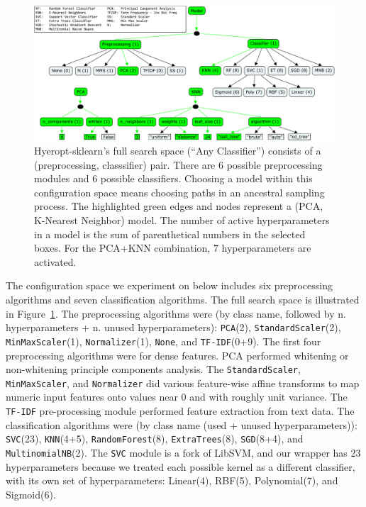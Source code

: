 \documentclass[wcp]{jmlr}
\begin{document}
\begin{figure}
    \centering
    \includegraphics[width=\textwidth]{graphics/sklearn_space_all_together}
    \caption{
        Hyeropt-sklearn's full search space (``Any Classifier'') consists of a (preprocessing, classsifier) pair.
        There are 6 possible preprocessing modules and 6 possible classifiers.
        Choosing a model within this configuration space means choosing paths in an ancestral sampling process.
        The highlighted green edges and nodes represent a (PCA, K-Nearest Neighbor) model.
        The number of active hyperparameters in a model is the sum of parenthetical numbers in the selected boxes. For the PCA+KNN combination, 7 hyperparameters are activated.
    }
    \label{fig:space}
\end{figure}
The configuration space we experiment on below includes six preprocessing algorithms and seven classification algorithms.
The full search space is illustrated in Figure~\ref{fig:space}.
The preprocessing algorithms were (by class name, followed by n. hyperparameters + n. unused hyperparameters): \texttt{PCA}(2), \texttt{StandardScaler}(2), \texttt{MinMaxScaler}(1), \texttt{Normalizer}(1), \texttt{None}, and \texttt{TF-IDF}(0+9).
The first four preprocessing algorithms were for dense features.
PCA performed whitening or non-whitening principle components analysis.
The \texttt{StandardScaler}, \texttt{MinMaxScaler}, and \texttt{Normalizer} did various feature-wise affine transforms to map numeric input features onto values near 0 and with roughly unit variance.
The \texttt{TF-IDF} pre-processing module performed feature extraction from text data.
The classification algorithms were (by class name (used + unused hyperparameters)): \texttt{SVC}(23), \texttt{KNN}(4+5), \texttt{RandomForest}(8), \texttt{ExtraTrees}(8), \texttt{SGD}(8+4), and \texttt{MultinomialNB}(2).
The \texttt{SVC} module is a fork of LibSVM, and our wrapper has 23 hyperparameters because we treated each possible kernel as a different classifier, with its own set of hyperparameters: Linear(4), RBF(5), Polynomial(7), and Sigmoid(6).
\end{document}
